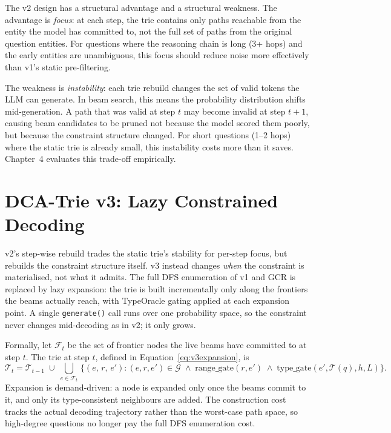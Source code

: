 The v2 design has a structural advantage and a structural weakness. The advantage is \textit{focus}: at each step, the trie contains only paths reachable from the entity the model has committed to, not the full set of paths from the original question entities. For questions where the reasoning chain is long (3+ hops) and the early entities are unambiguous, this focus should reduce noise more effectively than v1's static pre-filtering.

The weakness is \textit{instability}: each trie rebuild changes the set of valid tokens the LLM can generate. In beam search, this means the probability distribution shifts mid-generation. A path that was valid at step $t$ may become invalid at step $t+1$, causing beam candidates to be pruned not because the model scored them poorly, but because the constraint structure changed. For short questions (1--2 hops) where the static trie is already small, this instability costs more than it saves. Chapter~4 evaluates this trade-off empirically.

\section{DCA-Trie v3: Lazy Constrained Decoding}
\label{sec:ch3v3}

v2's step-wise rebuild trades the static trie's stability for per-step focus, but rebuilds the constraint structure itself. v3 instead changes \textit{when} the constraint is materialised, not what it admits. The full DFS enumeration of v1 and GCR is replaced by lazy expansion: the trie is built incrementally only along the frontiers the beams actually reach, with TypeOracle gating applied at each expansion point. A single \texttt{generate()} call runs over one probability space, so the constraint never changes mid-decoding as in v2; it only grows.

Formally, let $\mathcal{F}_t$ be the set of frontier nodes the live beams have committed to at step $t$. The trie at step $t$, defined in Equation~\eqref{eq:v3expansion}, is
\begin{equation}
  \mathcal{T}_t = \mathcal{T}_{t-1} \;\cup\; \bigcup_{e \in \mathcal{F}_t}\,
  \{(e,\, r,\, e') : (e, r, e') \in \mathcal{G} \;\land\;
  \text{range\_gate}(r, e') \;\land\;
  \text{type\_gate}(e', \mathcal{T}(q), h, L)\}.
  \label{eq:v3expansion}
\end{equation}
Expansion is demand-driven: a node is expanded only once the beams commit to it, and only its type-consistent neighbours are added. The construction cost tracks the actual decoding trajectory rather than the worst-case path space, so high-degree questions no longer pay the full DFS enumeration cost.

